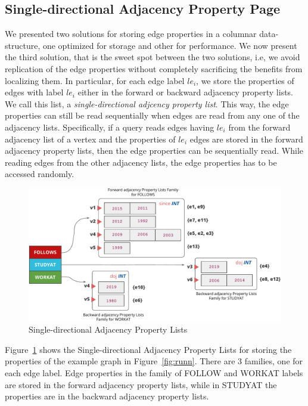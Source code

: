 \subsection{Single-directional Adjacency Property Page}

We presented two solutions for storing edge properties in a columnar data-structure, one optimized for storage and other for performance. We now present the third solution, that is the sweet spot between the two solutions, i.e, we avoid replication of the edge properties without completely sacrificing the benefits from localizing them. In particular, for each edge label $le_i$, we store the properties of edges with label $le_i$ either in the forward or backward adjacency property lists. We call this list, a \emph{single-directional adjcency property list}. This way, the edge properties can still be read sequentially when edges are read from any one of the adjacency lists.  Specifically, if a query reads edges having $le_i$ from the forward adjacency list of a vertex and the properties of $le_i$ edges are stored in the forward adjacency property lists, then the edge properties can be sequentially read. While reading edges from the other adjacency lists, the edge properties has to be accessed randomly.

\begin{figure}
	\vspace{-25pt}
	\hfill\includegraphics[scale=0.78]{img/single-dir-prop-list}\hspace*{\fill}
	\captionsetup{justification=centering}
	\caption{Single-directional Adjacency Property Lists}
	\label{fig:single-dir-prop-list}
	\vspace{0pt}
\end{figure}

Figure~\ref{fig:single-dir-prop-list} shows the Single-directional Adjacency Property Lists for storing the properties of the example graph in Figure~\ref{fig:runn}. There are 3 families, one for each edge label. Edge properties in the family of FOLLOW and WORKAT labels are stored in the forward adjacency property lists, while in STUDYAT the properties are in the backward adjacency property lists.

